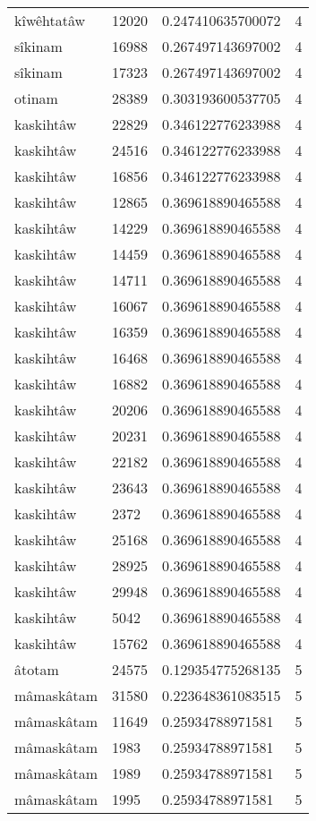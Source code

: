 \begin{longtable}{llll}
kîwêhtatâw & 12020 & 0.247410635700072 & 4 \\
sîkinam & 16988 & 0.267497143697002 & 4 \\
sîkinam & 17323 & 0.267497143697002 & 4 \\
otinam & 28389 & 0.303193600537705 & 4 \\
kaskihtâw & 22829 & 0.346122776233988 & 4 \\
kaskihtâw & 24516 & 0.346122776233988 & 4 \\
kaskihtâw & 16856 & 0.346122776233988 & 4 \\
kaskihtâw & 12865 & 0.369618890465588 & 4 \\
kaskihtâw & 14229 & 0.369618890465588 & 4 \\
kaskihtâw & 14459 & 0.369618890465588 & 4 \\
kaskihtâw & 14711 & 0.369618890465588 & 4 \\
kaskihtâw & 16067 & 0.369618890465588 & 4 \\
kaskihtâw & 16359 & 0.369618890465588 & 4 \\
kaskihtâw & 16468 & 0.369618890465588 & 4 \\
kaskihtâw & 16882 & 0.369618890465588 & 4 \\
kaskihtâw & 20206 & 0.369618890465588 & 4 \\
kaskihtâw & 20231 & 0.369618890465588 & 4 \\
kaskihtâw & 22182 & 0.369618890465588 & 4 \\
kaskihtâw & 23643 & 0.369618890465588 & 4 \\
kaskihtâw & 2372 & 0.369618890465588 & 4 \\
kaskihtâw & 25168 & 0.369618890465588 & 4 \\
kaskihtâw & 28925 & 0.369618890465588 & 4 \\
kaskihtâw & 29948 & 0.369618890465588 & 4 \\
kaskihtâw & 5042 & 0.369618890465588 & 4 \\
kaskihtâw & 15762 & 0.369618890465588 & 4 \\
âtotam & 24575 & 0.129354775268135 & 5 \\
mâmaskâtam & 31580 & 0.223648361083515 & 5 \\
mâmaskâtam & 11649 & 0.25934788971581 & 5 \\
mâmaskâtam & 1983 & 0.25934788971581 & 5 \\
mâmaskâtam & 1989 & 0.25934788971581 & 5 \\
mâmaskâtam & 1995 & 0.25934788971581 & 5 \\

\end{longtable}
